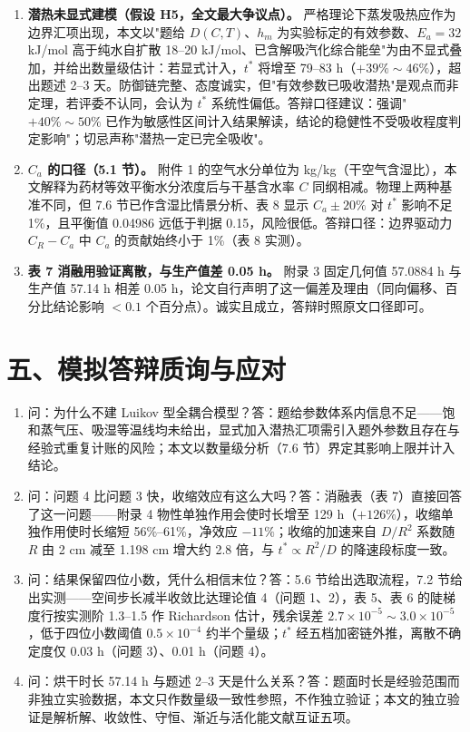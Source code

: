 \documentclass[12pt,a4paper]{ctexart}
\begin{document}
\begin{enumerate}[label=B\arabic*.,leftmargin=2.6em]
\item \textbf{潜热未显式建模（假设 H5，全文最大争议点）。} 严格理论下蒸发吸热应作为边界汇项出现，本文以"题给 $D(C,T)$、$h_m$ 为实验标定的有效参数、$E_a=32$ kJ/mol 高于纯水自扩散 18--20 kJ/mol、已含解吸汽化综合能垒"为由不显式叠加，并给出数量级估计：若显式计入，$t^*$ 将增至 79--83 h（$+39\%\sim46\%$），超出题述 2--3 天。防御链完整、态度诚实，但"有效参数已吸收潜热"是观点而非定理，若评委不认同，会认为 $t^*$ 系统性偏低。答辩口径建议：强调"$+40\%\sim50\%$ 已作为敏感性区间计入结果解读，结论的稳健性不受吸收程度判定影响"；切忌声称"潜热一定已完全吸收"。
\item \textbf{$C_a$ 的口径（5.1 节）。} 附件 1 的空气水分单位为 kg/kg（干空气含湿比），本文解释为药材等效平衡水分浓度后与干基含水率 $C$ 同纲相减。物理上两种基准不同，但 7.6 节已作含湿比情景分析、表 8 显示 $C_a\pm20\%$ 对 $t^*$ 影响不足 1\%，且平衡值 0.04986 远低于判据 0.15，风险很低。答辩口径：边界驱动力 $C_R-C_a$ 中 $C_a$ 的贡献始终小于 1\%（表 8 实测）。
\item \textbf{表 7 消融用验证离散，与生产值差 0.05 h。} 附录 3 固定几何值 57.0884 h 与生产值 57.14 h 相差 0.05 h，论文自行声明了这一偏差及理由（同向偏移、百分比结论影响 $<0.1$ 个百分点）。诚实且成立，答辩时照原文口径即可。
\end{enumerate}

\section{五、模拟答辩质询与应对}

\begin{enumerate}[label=Q\arabic*.,leftmargin=2.6em]
\item 问：为什么不建 Luikov 型全耦合模型？答：题给参数体系内信息不足——饱和蒸气压、吸湿等温线均未给出，显式加入潜热汇项需引入题外参数且存在与经验式重复计账的风险；本文以数量级分析（7.6 节）界定其影响上限并计入结论。
\item 问：问题 4 比问题 3 快，收缩效应有这么大吗？答：消融表（表 7）直接回答了这一问题——附录 4 物性单独作用会使时长增至 129 h（$+126\%$），收缩单独作用使时长缩短 56\%--61\%，净效应 $-11\%$；收缩的加速来自 $D/R^2$ 系数随 $R$ 由 2 cm 减至 1.198 cm 增大约 2.8 倍，与 $t^*\propto R^2/D$ 的降速段标度一致。
\item 问：结果保留四位小数，凭什么相信末位？答：5.6 节给出选取流程，7.2 节给出实测——空间步长减半收敛比达理论值 4（问题 1、2），表 5、表 6 的陡梯度行按实测阶 1.3--1.5 作 Richardson 估计，残余误差 $2.7\times10^{-5}\sim3.0\times10^{-5}$，低于四位小数阈值 $0.5\times10^{-4}$ 约半个量级；$t^*$ 经五档加密链外推，离散不确定度仅 0.03 h（问题 3）、0.01 h（问题 4）。
\item 问：烘干时长 57.14 h 与题述 2--3 天是什么关系？答：题面时长是经验范围而非独立实验数据，本文只作数量级一致性参照，不作独立验证；本文的独立验证是解析解、收敛性、守恒、渐近与活化能文献互证五项。
\end{enumerate}
\end{document}
